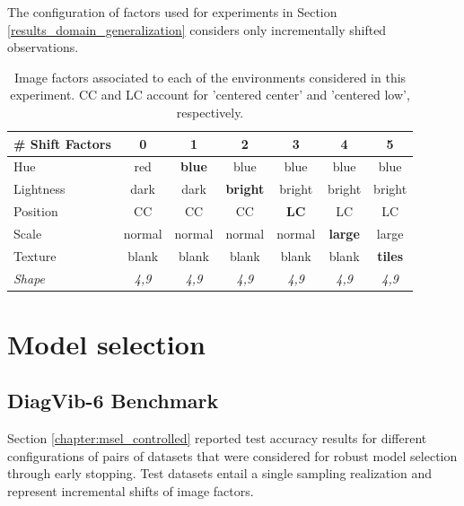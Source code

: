 \begin{dataset}
    The configuration of factors used for experiments in Section \ref{results_domain_generalization}
    considers only incrementally shifted observations.

    \begin{table}[H]
        \centering
        \begin{tabular}{l|c|c|c|c|c|c}
        \# Shift Factors  & 0 & 1 & 2 & 3 & 4 & 5 \\
        \midrule
        Hue & red & \textbf{blue} & blue & blue & blue & blue \\
        Lightness & dark & dark & \textbf{bright} & bright & bright & bright \\
        Position  & CC & CC & CC & \textbf{LC} & LC & LC \\
        Scale  & normal & normal & normal & normal & \textbf{large} & large \\
        Texture & blank & blank & blank & blank & blank & \textbf{tiles} \\
        \textit{Shape} & \textit{4,9} &  \textit{4,9} &  \textit{4,9} & \textit{4,9} & \textit{4,9} & \textit{4,9} \\
        \bottomrule
        \end{tabular}
        \caption{
        Image factors associated to each of the environments considered in this experiment. CC and LC account
        for 'centered center' and 'centered low', respectively.
        }
    \end{table}
\end{dataset}

\section{Model selection}

\subsection{DiagVib-6 Benchmark}

Section \ref{chapter:msel_controlled} reported test accuracy results for different configurations of 
pairs of datasets that were considered for robust model selection through early stopping. Test datasets entail
a single sampling realization and represent incremental shifts of image factors.

